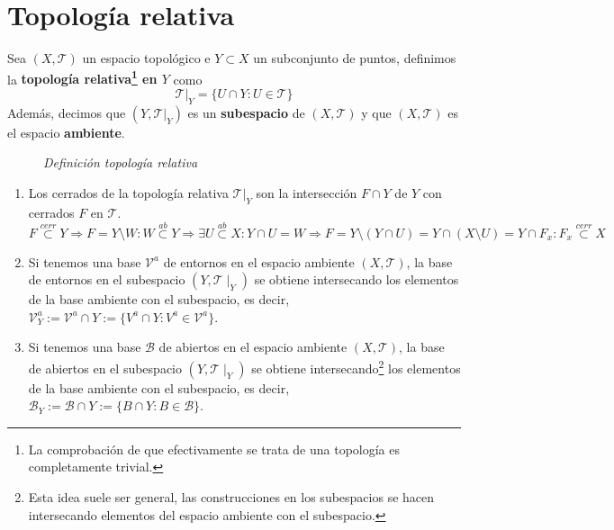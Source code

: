\section{Topología relativa}%
\label{sec:topologia_relativa}
\begin{defi}
Sea $\left( X, \mathcal{T} \right)$ un espacio topológico e $Y \subset X$ un subconjunto de puntos, definimos la \textbf{topología relativa\footnote{La comprobación de que efectivamente se trata de una topología es completamente trivial.} en $Y$} como
$$
\mathcal{T}|_Y = \{U \cap Y: U \in \mathcal{T}\}
$$
Además, decimos que $\left( Y, \mathcal{T}|_Y \right)$ es un \textbf{subespacio} de $\left( X, \mathcal{T} \right)$ y que $\left( X, \mathcal{T} \right)$ es el espacio \textbf{ambiente}. 
\begin{figure}[H]
    \centering
    \caption{\textit{Definición topología relativa}}
    \label{fig:definición-topología-relativa}
\end{figure}

\begin{obs}
\begin{enumerate}
    \item Los cerrados de la topología relativa $\mathcal{T}|_Y$ son la intersección $F\cap Y$ de $Y$ con cerrados $F$ en $\mathcal{T}$.
    $$
    F \stackrel{cerr}{\subset} Y \Rightarrow F = Y\setminus W : W \stackrel{ab}{\subset} Y \Rightarrow \exists U \stackrel{ab}{\subset}X : Y\cap U = W \Rightarrow F = Y \setminus (Y \cap U) = Y \cap  (X\setminus U) = Y \cap F_x : F_x \stackrel{cerr}{\subset} X
    $$
    \item Si tenemos una base $\mathcal{V}^a$ de entornos en el espacio ambiente $(X,\mathcal{T})$, la base de entornos en el subespacio $(Y,\mathcal{T}\mid_Y)$ se obtiene intersecando los elementos de la base ambiente con el subespacio, es decir, $\mathcal{V}^a_Y := \mathcal{V}^a \cap Y := \{V^a \cap Y : V^a \in \mathcal{V}^a\}$.

    \item Si tenemos una base $\mathcal{B}$ de abiertos en el espacio ambiente $(X,\mathcal{T})$, la base de abiertos en el subespacio $(Y,\mathcal{T}\mid_Y)$ se obtiene intersecando\footnote{Esta idea suele ser general, las construcciones en los subespacios se hacen intersecando elementos del espacio ambiente con el subespacio.} los elementos de la base ambiente con el subespacio, es decir, $\mathcal{B}_Y := \mathcal{B} \cap Y := \{B \cap Y : B \in \mathcal{B}\}$.
\end{enumerate}
\end{obs}



\end{defi}
